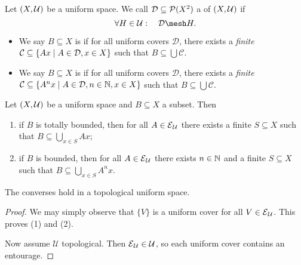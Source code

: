 \begin{definition}
Let $\left( X,\mathcal{U} \right)$ be a uniform space. We call $\mathcal{D} \subseteq \operatorname{\mathcal{P}}(X^2)$ a  of $\left( X,\mathcal{U} \right)$ if
\[ \forall H\in \mathcal{U}:\quad \mathcal{D}\mesh H. \]
\begin{itemize}
\item We say $B\subseteq X$ is  if for all uniform covers $\mathcal{D}$, there exists a \emph{finite} $\mathcal{C} \subseteq \left\{ Ax \;\middle|\; A\in \mathcal{D}, x\in X \right\}$ such that $B\subseteq \bigcup \mathcal{C}$.
\item We say $B\subseteq X$ is  if for all uniform covers $\mathcal{D}$, there exists a \emph{finite} $\mathcal{C} \subseteq \left\{ A^nx \;\middle|\; A\in \mathcal{D}, n\in \mathbb{N}, x\in X \right\}$ such that $B\subseteq \bigcup \mathcal{C}$.
\end{itemize}
\end{definition}

\begin{lemma} \label{topologicalBoundednessLemma}
Let $\left( X,\mathcal{U} \right)$ be a uniform space and $B\subseteq X$ a subset. Then
\begin{enumerate}
\item if $B$ is totally bounded, then for all $A\in \operatorname{\mathcal{E}}_\mathcal{U}$ there exists a finite $S\subseteq X$ such that $B\subseteq \bigcup_{x\in S}Ax$;
\item if $B$ is bounded, then for all $A\in \operatorname{\mathcal{E}}_\mathcal{U}$ there exists $n\in \mathbb{N}$ and a finite $S\subseteq X$ such that $B\subseteq \bigcup_{x\in S}A^nx$.
\end{enumerate}
The converses hold in a topological uniform space.
\end{lemma}
\begin{proof}
We may simply observe that $\{V\}$ is a uniform cover for all $V\in \operatorname{\mathcal{E}}_\mathcal{U}$. This proves (1) and (2).

Now assume $\mathcal{U}$ topological. Then $\operatorname{\mathcal{E}}_\mathcal{U} \in \mathcal{U}$, so each uniform cover contains an entourage. 
\end{proof}


